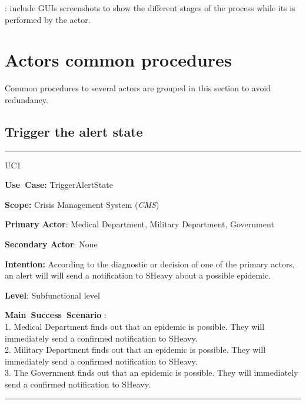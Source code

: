 : include GUIs screenshots to show the
different stages of the process while its is performed by the actor.



\section{Actors common procedures}
Common procedures to several actors are grouped in this section to avoid
redundancy.

\subsection{Trigger the alert state}
\vspace{0.5cm}
\hrule
\vspace{0.5cm}
\begin{lyxlist}{UC1}
\small{
\item [\textbf{Use~Case:}] TriggerAlertState
\item [\textbf{Scope:}] Crisis Management System (\emph{CMS})
\item [\textbf{Primary Actor}:] Medical Department, Military Department,
Government
\item [\textbf{Secondary Actor}:] None
\item [\textbf{Intention:}] According to the diagnostic or decision of one of
the primary actors, an alert will will send a notification to SHeavy about a
possible epidemic.
\item [\textbf{Level}:]Subfunctional level
\item [\textbf{Main~Success~Scenario}]:\\
1. Medical Department finds out that an epidemic is possible. They will
immediately send a confirmed notification to SHeavy.\\
2. Military Department finds out that an epidemic is possible. They will
immediately send a confirmed notification to SHeavy.\\
3. The Government finds out that an epidemic is possible. They will
immediately send a confirmed notification to SHeavy.\\
}
\end{lyxlist}
\hrule 
\vspace{0.5cm} 

